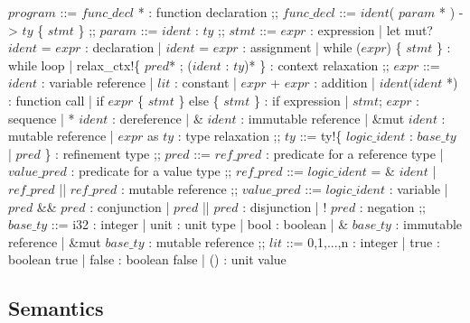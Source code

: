 \documentclass{article}
\newcommand{\ccolon}[0]{: }
\newcommand{\cmid}[0]{| }
\newcommand{\cdisj}[0]{|| }
\theoremstyle{definition}
\begin{document}
\begin{bnfgrammar}
  $program$ ::=
    $func\_decl$ * : function declaration
  ;;
  $func\_decl$ ::=
    $ident$( $param$ * ) -> $ty$ \{ $stmt$ \}
  ;;
  $param$ ::= $ident$ \ccolon  $ty$
  ;;
  $stmt$ ::= 
    $expr$                                                : expression
    | let mut? $ident$ = $expr$                           : declaration
    | $ident$ = $expr$                                    : assignment
    | while ($expr$) \{ $stmt$ \}                         : while loop
    | relax\_ctx!\{ $pred$* ; ($ident$ \ccolon $ty$)* \}  : context relaxation
  ;;
  $expr$ ::=
    $ident$                                         : variable reference
    | $lit$                                         : constant
    | $expr$ + $expr$                               : addition
    | $ident$($ident$ *)                            : function call
    | if $expr$ \{ $stmt$ \} else \{ $stmt$ \}      : if expression
    | $stmt$; $expr$                                : sequence
    | * $ident$                                     : dereference
    | \& $ident$                                    : immutable reference
    | \&mut $ident$                                 : mutable reference
    | $expr$ as $ty$                                : type relaxation
  ;;
  $ty$ ::= ty!\{ $logic\_ident$ \ccolon $base\_ty$ \cmid $pred$ \} : refinement type
  ;;
  $pred$ ::=
    $ref\_pred$                                     : predicate for a reference type 
    | $value\_pred$                                 : predicate for a value type
  ;;
  $ref\_pred$ ::=
    $logic\_ident$ = \& $ident$
    | $ref\_pred$ \cdisj $ref\_pred$         : mutable reference 
  ;;
  $value\_pred$ ::=
    $logic\_ident$                : variable
  | $pred$ \&\& $pred$            : conjunction
  | $pred$ \cdisj $pred$          : disjunction
  | ! $pred$                      : negation
  ;;
  $base\_ty$ ::=
    i32                     : integer
    | unit                  : unit type
    | bool                  : boolean
    | \& $base\_ty$         : immutable reference
    | \&mut $base\_ty$      : mutable reference
  ;;
  $lit$ ::=
      0,1,...,n             : integer
    | true                  : boolean true
    | false                 : boolean false
    | ()                    : unit value
\end{bnfgrammar}

\subsection{Semantics}
\end{document}
